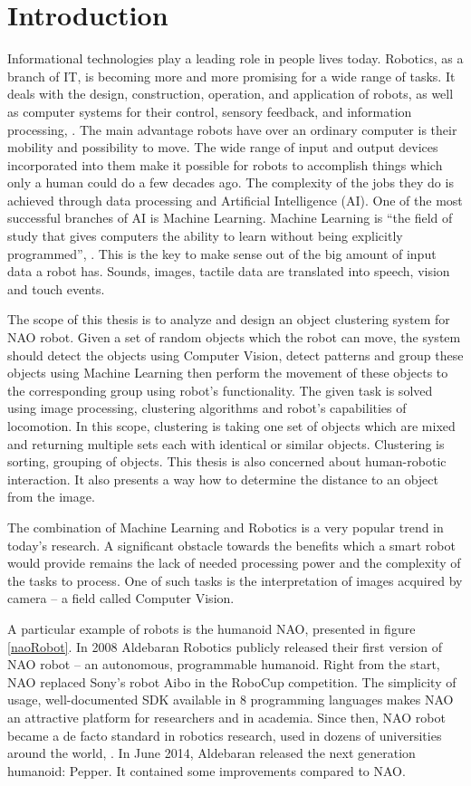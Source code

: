 \section*{Introduction}
  Informational technologies play a leading role in people lives today. Robotics, as a branch of IT, is becoming more and more promising for a wide range of tasks. It deals with the design, construction, operation, and application of robots, as well as computer systems for their control, sensory feedback, and information processing, \cite{robotics}. The main advantage robots have over an ordinary computer is their mobility and possibility to move. The wide range of input and output devices incorporated into them make it possible for robots to accomplish things which only a human could do a few decades ago. The complexity of the jobs they do is achieved through data processing and Artificial Intelligence (AI). One of the most successful branches of AI is Machine Learning. Machine Learning is ``the field of study that gives computers the ability to learn without being explicitly programmed'', \cite{tooBigToIgnore}. This is the key to make sense out of the big amount of input data a robot has. Sounds, images, tactile data are translated into speech, vision and touch events. 

  The scope of this thesis is to analyze and design an object clustering system for NAO robot. Given a set of random objects which the robot can move, the system should detect the objects using Computer Vision, detect patterns and group these objects using Machine Learning then perform the movement of these objects to the corresponding group using robot's functionality. The given task is solved using image processing, clustering algorithms and robot's capabilities of locomotion. In this scope, clustering is taking one set of objects which are mixed and returning multiple sets each with identical or similar objects. Clustering is sorting, grouping of objects. This thesis is also concerned about human-robotic interaction. It also presents a way how to determine the distance to an object from the image. 

The combination of Machine Learning and Robotics is a very popular trend in today's research. A significant obstacle towards the benefits which a smart robot would provide remains the lack of needed processing power and the complexity of the tasks to process. One of such tasks is the interpretation of images acquired by camera -- a field called Computer Vision. 

  A particular example of robots is the humanoid NAO, presented in figure \ref{naoRobot}. In 2008 Aldebaran Robotics publicly released their first version of NAO robot -- an autonomous, programmable humanoid. Right from the start, NAO replaced Sony's robot Aibo in the RoboCup competition. The simplicity of usage, well-documented SDK available in 8 programming languages makes NAO an attractive platform for researchers and in academia. Since then, NAO robot became a de facto standard in robotics research, used in dozens of universities around the world, \cite{naoWiki}. In June 2014, Aldebaran released the next generation humanoid: Pepper. It contained some improvements compared to NAO.

